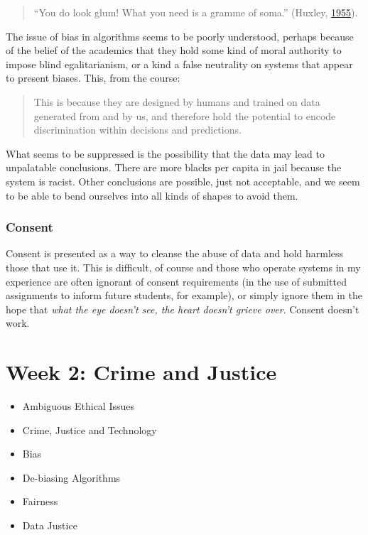 \documentclass[
]{book}
\providecommand{\tightlist}{%
  \setlength{\itemsep}{0pt}\setlength{\parskip}{0pt}}
\begin{document}
\begin{quote}
``You do look glum! What you need is a gramme of soma.'' (Huxley, \protect\hyperlink{ref-Huxley1955}{1955}).
\end{quote}

The issue of bias in algorithms seems to be poorly understood, perhaps because of the belief of the academics that they hold some kind of moral authority to impose blind egalitarianism, or a kind a false neutrality on systems that appear to present biases. This, from the course:

\begin{quote}
This is because they are designed by humans and trained on data generated from and by us, and therefore hold the potential to encode discrimination within decisions and predictions.
\end{quote}

What seems to be suppressed is the possibility that the data may lead to unpalatable conclusions. There are more blacks per capita in jail because the system is racist. Other conclusions are possible, just not acceptable, and we seem to be able to bend ourselves into all kinds of shapes to avoid them.

\hypertarget{consent}{%
\subsection{Consent}\label{consent}}

Consent is presented as a way to cleanse the abuse of data and hold harmless those that use it. This is difficult, of course and those who operate systems in my experience are often ignorant of consent requirements (in the use of submitted assignments to inform future students, for example), or simply ignore them in the hope that \emph{what the eye doesn't see, the heart doesn't grieve over}. Consent doesn't work.

\hypertarget{week-2-crime-and-justice}{%
\chapter{Week 2: Crime and Justice}\label{week-2-crime-and-justice}}

\begin{itemize}
\tightlist
\item
  Ambiguous Ethical Issues
\item
  Crime, Justice and Technology
\item
  Bias
\item
  De-biasing Algorithms
\item
  Fairness
\item
  Data Justice
\end{itemize}
\end{document}
